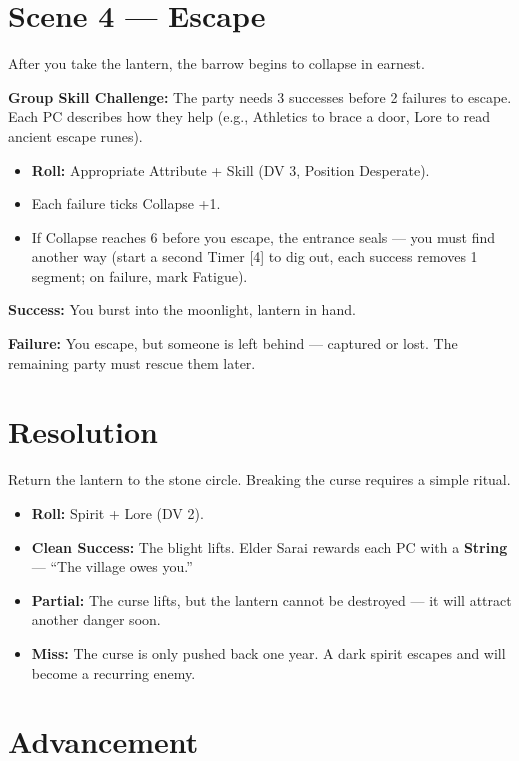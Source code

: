 \documentclass[11pt]{book}
\begin{document}
\section{Scene 4 --- Escape}

After you take the lantern, the barrow begins to collapse in earnest.

\textbf{Group Skill Challenge:} The party needs 3 successes before 2 failures to escape. Each PC describes how they help (e.g., Athletics to brace a door, Lore to read ancient escape runes).

\begin{itemize}
  \item \textbf{Roll:} Appropriate Attribute + Skill (DV 3, Position Desperate).
  \item Each failure ticks Collapse +1.
  \item If Collapse reaches 6 before you escape, the entrance seals --- you must find another way (start a second Timer [4] to dig out, each success removes 1 segment; on failure, mark Fatigue).
\end{itemize}

\textbf{Success:} You burst into the moonlight, lantern in hand.

\textbf{Failure:} You escape, but someone is left behind --- captured or lost. The remaining party must rescue them later.

\section{Resolution}

Return the lantern to the stone circle. Breaking the curse requires a simple ritual.

\begin{itemize}
  \item \textbf{Roll:} Spirit + Lore (DV 2).
  \item \textbf{Clean Success:} The blight lifts. Elder Sarai rewards each PC with a \textbf{String} --- ``The village owes you.''
  \item \textbf{Partial:} The curse lifts, but the lantern cannot be destroyed --- it will attract another danger soon.
  \item \textbf{Miss:} The curse is only pushed back one year. A dark spirit escapes and will become a recurring enemy.
\end{itemize}

\section{Advancement}
\end{document}
